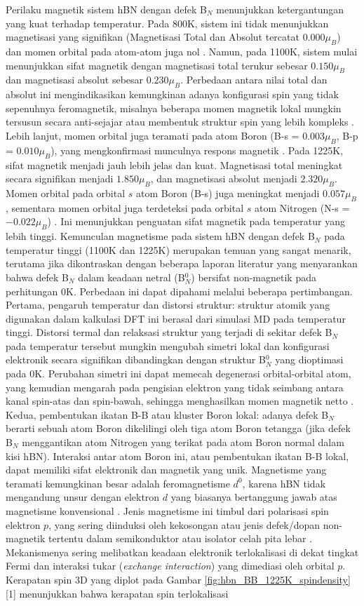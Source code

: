 Perilaku magnetik sistem hBN dengan defek B$_N$ menunjukkan ketergantungan yang kuat terhadap temperatur. Pada 800K, sistem ini tidak menunjukkan magnetisasi yang signifikan (Magnetisasi Total dan Absolut tercatat $0.000 \mu_B$) dan momen orbital pada atom-atom juga nol . Namun, pada 1100K, sistem mulai menunjukkan sifat magnetik dengan magnetisasi total terukur sebesar $0.150 \mu_B$ dan magnetisasi absolut sebesar $0.230 \mu_B$. Perbedaan antara nilai total dan absolut ini mengindikasikan kemungkinan adanya konfigurasi spin yang tidak sepenuhnya feromagnetik, misalnya beberapa momen magnetik lokal mungkin tersusun secara anti-sejajar atau membentuk struktur spin yang lebih kompleks . Lebih lanjut, momen orbital juga teramati pada atom Boron (B-s = $0.003 \mu_B$, B-p = $0.010 \mu_B$), yang mengkonfirmasi munculnya respons magnetik . Pada 1225K, sifat magnetik menjadi jauh lebih jelas dan kuat. Magnetisasi total meningkat secara signifikan menjadi $1.850 \mu_B$, dan magnetisasi absolut menjadi $2.320 \mu_B$. Momen orbital pada orbital $s$ atom Boron (B-s) juga meningkat menjadi $0.057 \mu_B$, sementara momen orbital juga terdeteksi pada orbital $s$ atom Nitrogen (N-s = $-0.022 \mu_B$) . Ini menunjukkan penguatan sifat magnetik pada temperatur yang lebih tinggi. Kemunculan magnetisme pada sistem hBN dengan defek B$_N$ pada temperatur tinggi (1100K dan 1225K) merupakan temuan yang sangat menarik, terutama jika dikontraskan dengan beberapa laporan literatur yang menyarankan bahwa defek B$_N$ dalam keadaan netral (B$_N^0$) bersifat non-magnetik pada perhitungan 0K. Perbedaan ini dapat dipahami melalui beberapa pertimbangan. Pertama, pengaruh temperatur dan distorsi struktur: struktur atomik yang digunakan dalam kalkulasi DFT ini berasal dari simulasi MD pada temperatur tinggi. Distorsi termal dan relaksasi struktur yang terjadi di sekitar defek B$_N$ pada temperatur tersebut mungkin mengubah simetri lokal dan konfigurasi elektronik secara signifikan dibandingkan dengan struktur B$_N^0$ yang dioptimasi pada 0K. Perubahan simetri ini dapat memecah degenerasi orbital-orbital atom, yang kemudian mengarah pada pengisian elektron yang tidak seimbang antara kanal spin-atas dan spin-bawah, sehingga menghasilkan momen magnetik netto . Kedua, pembentukan ikatan B-B atau kluster Boron lokal: adanya defek B$_N$ berarti sebuah atom Boron dikelilingi oleh tiga atom Boron tetangga (jika defek B$_N$ menggantikan atom Nitrogen yang terikat pada atom Boron normal dalam kisi hBN). Interaksi antar atom Boron ini, atau pembentukan ikatan B-B lokal, dapat memiliki sifat elektronik dan magnetik yang unik. Magnetisme yang teramati kemungkinan besar adalah feromagnetisme $d^0$, karena hBN tidak mengandung unsur dengan elektron $d$ yang biasanya bertanggung jawab atas magnetisme konvensional . Jenis magnetisme ini timbul dari polarisasi spin elektron $p$, yang sering diinduksi oleh kekosongan atau jenis defek/dopan non-magnetik tertentu dalam semikonduktor atau isolator celah pita lebar \citep{Zunger2003}. Mekanismenya sering melibatkan keadaan elektronik terlokalisasi di dekat tingkat Fermi dan interaksi tukar (\textit{exchange interaction}) yang dimediasi oleh orbital $p$. Kerapatan spin 3D yang diplot pada Gambar \ref{fig:hbn_BB_1225K_spindensity} [1] menunjukkan bahwa kerapatan spin terlokalisasi 